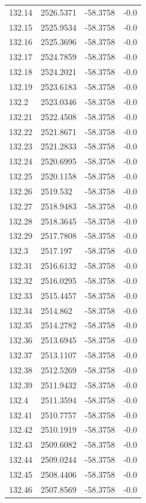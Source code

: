 \begin{table}[H]
\begin{tabular}{llll}
132.14 & 2526.5371 & -58.3758 & -0.0 \\
132.15 & 2525.9534 & -58.3758 & -0.0 \\
132.16 & 2525.3696 & -58.3758 & -0.0 \\
132.17 & 2524.7859 & -58.3758 & -0.0 \\
132.18 & 2524.2021 & -58.3758 & -0.0 \\
132.19 & 2523.6183 & -58.3758 & -0.0 \\
132.2 & 2523.0346 & -58.3758 & -0.0 \\
132.21 & 2522.4508 & -58.3758 & -0.0 \\
132.22 & 2521.8671 & -58.3758 & -0.0 \\
132.23 & 2521.2833 & -58.3758 & -0.0 \\
132.24 & 2520.6995 & -58.3758 & -0.0 \\
132.25 & 2520.1158 & -58.3758 & -0.0 \\
132.26 & 2519.532 & -58.3758 & -0.0 \\
132.27 & 2518.9483 & -58.3758 & -0.0 \\
132.28 & 2518.3645 & -58.3758 & -0.0 \\
132.29 & 2517.7808 & -58.3758 & -0.0 \\
132.3 & 2517.197 & -58.3758 & -0.0 \\
132.31 & 2516.6132 & -58.3758 & -0.0 \\
132.32 & 2516.0295 & -58.3758 & -0.0 \\
132.33 & 2515.4457 & -58.3758 & -0.0 \\
132.34 & 2514.862 & -58.3758 & -0.0 \\
132.35 & 2514.2782 & -58.3758 & -0.0 \\
132.36 & 2513.6945 & -58.3758 & -0.0 \\
132.37 & 2513.1107 & -58.3758 & -0.0 \\
132.38 & 2512.5269 & -58.3758 & -0.0 \\
132.39 & 2511.9432 & -58.3758 & -0.0 \\
132.4 & 2511.3594 & -58.3758 & -0.0 \\
132.41 & 2510.7757 & -58.3758 & -0.0 \\
132.42 & 2510.1919 & -58.3758 & -0.0 \\
132.43 & 2509.6082 & -58.3758 & -0.0 \\
132.44 & 2509.0244 & -58.3758 & -0.0 \\
132.45 & 2508.4406 & -58.3758 & -0.0 \\
132.46 & 2507.8569 & -58.3758 & -0.0 \\

\end{tabular}
\end{table}

